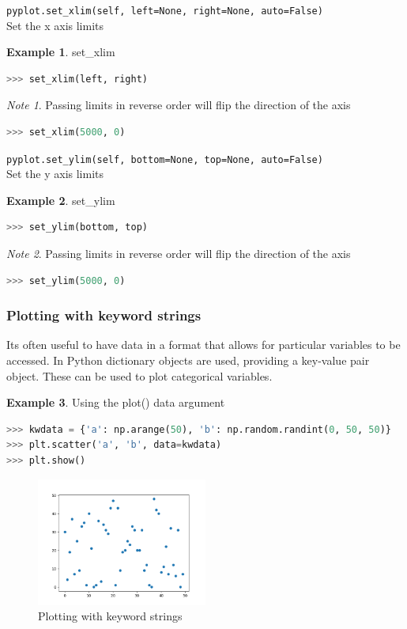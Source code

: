 \documentclass{article}
\theoremstyle{definition}
\newtheorem{ex}{Example}[subsection]
\theoremstyle{remark}
\newtheorem*{nb}{Note}
\newcommand{\func}[2]{\noindent\lstinline{#1}\\#2}
\begin{document}
\func{pyplot.set_xlim(self, left=None, right=None, auto=False)}{Set the x axis limits}

\begin{ex}set\_xlim
\begin{lstlisting}[language=Python]
>>> set_xlim(left, right)
\end{lstlisting}
\begin{nb}
Passing limits in reverse order will flip the direction of the axis
\end{nb}
\begin{lstlisting}[language=Python]
>>> set_xlim(5000, 0)
\end{lstlisting}
\end{ex}

\func{pyplot.set_ylim(self, bottom=None, top=None, auto=False)}{Set the y axis limits}

\begin{ex}set\_ylim
\begin{lstlisting}[language=Python]
>>> set_ylim(bottom, top)
\end{lstlisting}
\begin{nb}
Passing limits in reverse order will flip the direction of the axis
\end{nb}
\begin{lstlisting}[language=Python]
>>> set_ylim(5000, 0)
\end{lstlisting}
\end{ex}

\subsubsection{Plotting with keyword strings}

Its often useful to have data in a format that allows for particular variables to be accessed. In Python dictionary objects are used, providing a key-value pair object. These can be used to plot categorical variables.

\begin{ex} Using the plot() data argument
\begin{lstlisting}[language=Python]
>>> kwdata = {'a': np.arange(50), 'b': np.random.randint(0, 50, 50)}
>>> plt.scatter('a', 'b', data=kwdata)
>>> plt.show()
\end{lstlisting}

\begin{figure}[h!]
    \centering
    \includegraphics[width=0.5\textwidth]{matplotlib_using_kwdata}
    \caption{Plotting with keyword strings}
    \label{fig:mpl_kw}
\end{figure}
\end{ex}
\end{document}
